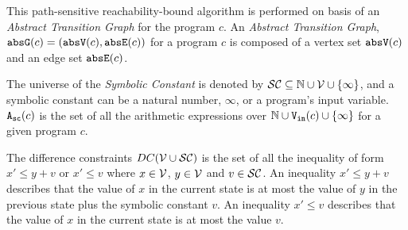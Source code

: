 This path-sensitive reachability-bound algorithm
is performed on basis of an \emph{Abstract Transition Graph} for the program $c$.
An \emph{Abstract Transition Graph}, $\mathtt{abs}{\mathtt{G}}(c) =(\mathtt{abs}{\mathtt{V}}(c), \mathtt{abs}{\mathtt{E}}(c))$ for a program $c$ is composed of
a vertex set $\mathtt{abs}{\mathtt{V}}(c)$ and an edge set $\mathtt{abs}{\mathtt{E}}(c)$.
%
%

\begin{defn}
  \label{def:symbolic_expr}
  The universe of the \emph{Symbolic Constant} is denoted by $\mathcal{SC} \subseteq \mathbb{N} \cup \mathcal{V} \cup \{\infty \}$, and a symbolic constant can be a natural number, $\infty$, or a program's input variable.
  ${\mathtt{A_{sc}}}(c)$ is the set of all the arithmetic expressions over $\mathbb{N} \cup {\ensuremath{\mathtt{V_{\mathtt{in}}}}}(c) \cup \{\infty \}$ for a given program $c$.
\end{defn}

\begin{defn}
 The difference constraints $DC(\mathcal{V}  \cup \mathcal{SC})$ is the set of all the inequality of
form $x' \leq y + v$ or $x' \leq v$ where $x \in \mathcal{V} $, 
$y \in \mathcal{V}$ and $v \in \mathcal{SC}$.
An inequality $x' \leq y + v$ describes that the value of $x$ in the current state is
at most the value of $y$ in the previous state plus the symbolic constant $v$.
An inequality $x' \leq v$ describes that the value of $x$ in the current state is
at most the value $v$.
\end{defn}

